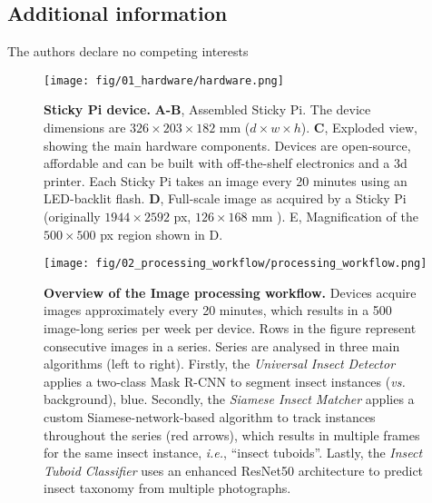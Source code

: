 \documentclass[12pt]{article}
\begin{document}
\begin{linenumbers}
		\section*{Additional information}
		The authors declare no competing interests

		
	\end{linenumbers}
	{
		
		
	}

	
	
	\pagebreak
	\begin{figure}[ht]
		\centering
		\texttt{[image: fig/01\_hardware/hardware.png]}
		\caption{\textbf{Sticky Pi device.} \textbf{A-B}, Assembled Sticky Pi. The device dimensions are $326 \times{} 203 \times{} 182$ mm ($d \times{} w \times{} h$). \textbf{C}, Exploded view, showing the main hardware components. Devices are open-source, affordable and can be built with off-the-shelf electronics and a 3d printer. Each Sticky Pi takes an image every 20 minutes using an LED-backlit flash. \textbf{D}, Full-scale image as acquired by a Sticky Pi (originally $1944 \times{} 2592$ px, $126 \times{} 168$ mm ). E, Magnification of the $500 \times{} 500$ px region shown in D.}
		\label{fig:01}
	\end{figure}
	\pagebreak

	\begin{figure}[ht]
		\centering
		\texttt{[image: fig/02\_processing\_workflow/processing\_workflow.png]}
		\caption{\textbf{Overview of the Image processing workflow.} Devices acquire images approximately every 20 minutes, which results in a 500 image-long series per week per device. Rows in the figure represent consecutive images in a series. Series are analysed in three main algorithms (left to right). Firstly, the \emph{Universal Insect Detector} applies a two-class Mask R-CNN to segment insect instances (\emph{vs.} background), blue. Secondly, the \emph{Siamese Insect Matcher} applies a custom Siamese-network-based algorithm to track instances throughout the series (red arrows), which results in multiple frames for the same insect instance, \emph{i.e.}, “insect tuboids”. Lastly, the \emph{Insect Tuboid Classifier} uses an enhanced ResNet50 architecture to predict insect taxonomy from multiple photographs.}
		\label{fig:02}
	\end{figure}

	\pagebreak
\end{document}
